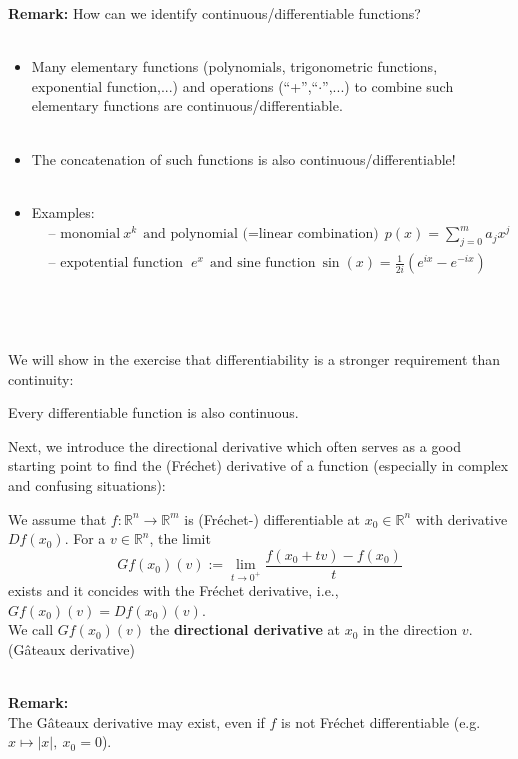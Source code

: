 \begin{frame}
\textbf{Remark:} How can we identify continuous/differentiable functions?\\~\\
\begin{itemize}
	\item 
	Many elementary functions (polynomials, trigonometric functions, exponential function,...) and operations (``+'',``$\cdot$'',...) to combine such elementary functions are continuous/differentiable.\\~\\
	\item
	The concatenation of such functions is also continuous/differentiable!\\~\\
	\item Examples:
	\begin{align*}
	&\text{-- monomial}~x^k~~\text{and polynomial (=linear combination)}~~p(x)=\sum_{j=0}^m a_j x^j\\
	&\text{-- expotential function~}~e^x~~\text{and sine function}~\sin(x)=\frac{1}{2i}(e^{ix}-e^{-ix})
	\end{align*}
\end{itemize}
~\\~\\~\\
We will show in the exercise that differentiability is a stronger requirement than continuity:
\begin{theorem}
	Every differentiable function is also continuous.
\end{theorem}
\end{frame}


\begin{frame}
Next, we introduce the directional derivative which often serves as a good starting point to find the (Fréchet) derivative  of a function (especially in complex and confusing situations):

\begin{definition}
	We assume that $f:\mathbb{R}^n\rightarrow\mathbb{R}^m$ is (Fr\'{e}chet-) differentiable at $x_0\in\mathbb{R}^n$ with derivative $Df(x_0)$. For a $v\in\mathbb{R}^n$, the limit
	$$
	Gf(x_0)(v):=\lim_{t\to 0^+}\frac{f(x_0+tv)-f(x_0)}{t}
	$$
	exists and it concides with the Fr\'{e}chet derivative, i.e., $Gf(x_0)(v)=Df(x_0)(v)$.\\
	We call $Gf(x_0)(v)$ the \textbf{directional derivative} at $x_0$ in the direction $v$. (G\^{a}teaux derivative)
\end{definition}
~\\
\textbf{Remark:}\\
The G\^{a}teaux derivative may exist, even if $f$ is not Fr\'{e}chet differentiable (e.g. $x\mapsto |x|,~x_0=0$).\\

\end{frame}


